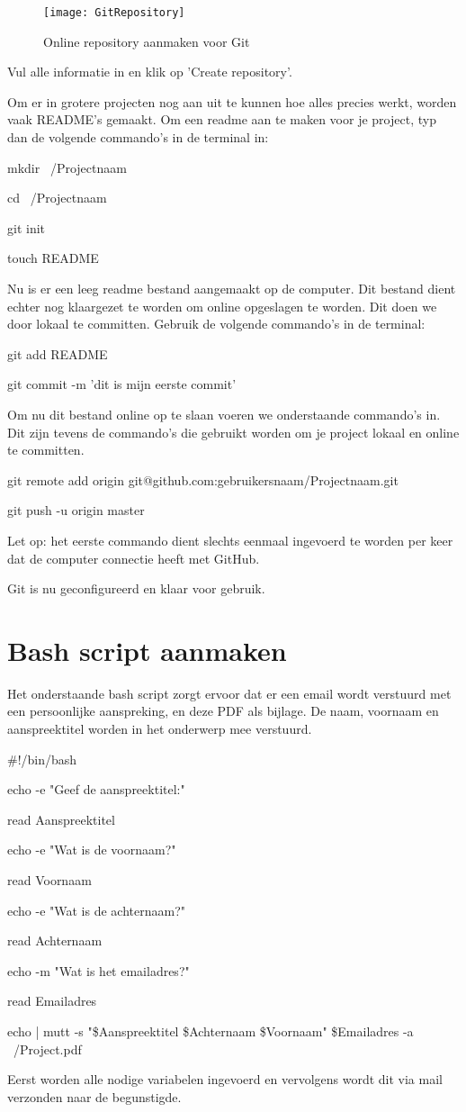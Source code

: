 \documentclass[12pt]{article}
\begin{document}
\begin{figure} [!ht]
\begin{center}
	\texttt{[image: GitRepository]}
\end{center}
	\caption{Online repository aanmaken voor Git}
\end{figure}

Vul alle informatie in en klik op 'Create repository'.

Om er in grotere projecten nog aan uit te kunnen hoe alles precies werkt, worden vaak README's gemaakt. Om een readme aan te maken voor je project, typ dan de volgende commando's in de terminal in:

mkdir ~/Projectnaam

cd ~/Projectnaam

git init

touch README

Nu is er een leeg readme bestand aangemaakt op de computer. Dit bestand dient echter nog klaargezet te worden om online opgeslagen te worden. Dit doen we door lokaal te committen. Gebruik de volgende commando's in de terminal:

git add README

git commit -m 'dit is mijn eerste commit'

Om nu dit bestand online op te slaan voeren we onderstaande commando's in. Dit zijn tevens de commando's die gebruikt worden om je project lokaal en online te committen.

git remote add origin git@github.com:gebruikersnaam/Projectnaam.git

git push -u origin master

Let op: het eerste commando dient slechts eenmaal ingevoerd te worden per keer dat de computer connectie heeft met GitHub.

Git is nu geconfigureerd en klaar voor gebruik.
\newpage
\section{Bash script aanmaken}
Het onderstaande bash script zorgt ervoor dat er een email wordt verstuurd met een persoonlijke aanspreking, en deze PDF als bijlage. De naam, voornaam en aanspreektitel worden in het onderwerp mee verstuurd.

\#!/bin/bash

echo -e "Geef de aanspreektitel:"

read Aanspreektitel

echo -e "Wat is de voornaam?"

read Voornaam

echo -e "Wat is de achternaam?"

read Achternaam

echo -m "Wat is het emailadres?"

read Emailadres

echo | mutt -s "\$Aanspreektitel \$Achternaam \$Voornaam" \$Emailadres -a ~/Project.pdf


Eerst worden alle nodige variabelen ingevoerd en vervolgens wordt dit via mail verzonden naar de begunstigde.
\newpage
\nocite{*}


\end{document}
